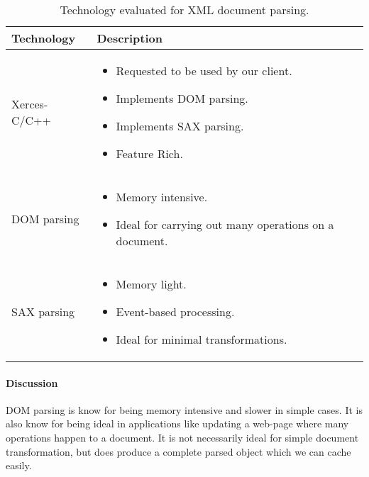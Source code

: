 \begin{table}[H]
  \begin{center}
    \begin{tabular}{ | l | p{10cm} | }
      \hline
      Technology & Description  \\ \hline

      Xerces-C/C++ \cite{xerces} &
      \begin{itemize}
        \item Requested to be used by our client.
        \item Implements DOM parsing.
        \item Implements SAX parsing.
        \item Feature Rich.
      \end{itemize} \\ \hline

      DOM parsing \cite{dom-vs-sax} &
      \begin{itemize}
        \item Memory intensive.
        \item Ideal for carrying out many operations on a document.
      \end{itemize} \\ \hline

      SAX parsing \cite{dom-vs-sax} &
      \begin{itemize}
        \item Memory light.
        \item Event-based processing.
        \item Ideal for minimal transformations.
      \end{itemize} \\ \hline
    \end{tabular}
  \end{center}
  \caption{Technology evaluated for XML document parsing.}
\end{table}

\paragraph{Discussion}

DOM parsing is know for being memory intensive and slower in simple cases.
It is also know for being ideal in applications like updating a web-page where many operations happen to a document.
It is not necessarily ideal for simple document transformation, but does produce a complete parsed object which we can cache easily.

